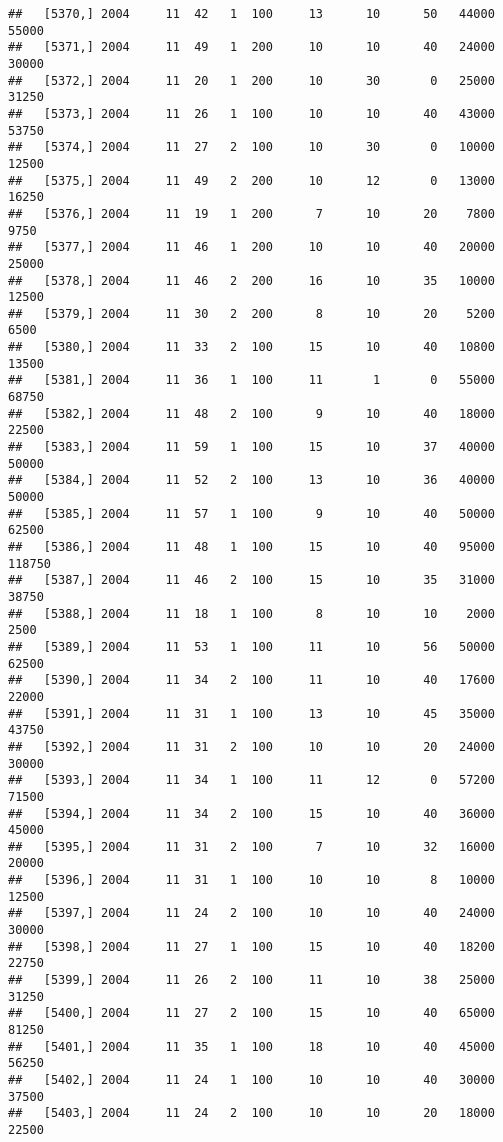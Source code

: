 \documentclass{article}\usepackage[]{graphicx}\usepackage[]{color}
\makeatletter
\newenvironment{kframe}{%
 \def\at@end@of@kframe{}%
 \ifinner\ifhmode%
  \def\at@end@of@kframe{\end{minipage}}%
  \begin{minipage}{\columnwidth}%
 \fi\fi%
 \def\FrameCommand##1{\hskip\@totalleftmargin \hskip-\fboxsep
 \colorbox{shadecolor}{##1}\hskip-\fboxsep
     \hskip-\linewidth \hskip-\@totalleftmargin \hskip\columnwidth}%
 \MakeFramed {\advance\hsize-\width
   \@totalleftmargin\z@ \linewidth\hsize
   \@setminipage}}%
 {\par\unskip\endMakeFramed%
 \at@end@of@kframe}
\newenvironment{knitrout}{}{} %
\makeatother
\begin{document}
\begin{knitrout}
\begin{kframe}
\begin{verbatim}
##   [5370,] 2004     11  42   1  100     13      10      50   44000   55000
##   [5371,] 2004     11  49   1  200     10      10      40   24000   30000
##   [5372,] 2004     11  20   1  200     10      30       0   25000   31250
##   [5373,] 2004     11  26   1  100     10      10      40   43000   53750
##   [5374,] 2004     11  27   2  100     10      30       0   10000   12500
##   [5375,] 2004     11  49   2  200     10      12       0   13000   16250
##   [5376,] 2004     11  19   1  200      7      10      20    7800    9750
##   [5377,] 2004     11  46   1  200     10      10      40   20000   25000
##   [5378,] 2004     11  46   2  200     16      10      35   10000   12500
##   [5379,] 2004     11  30   2  200      8      10      20    5200    6500
##   [5380,] 2004     11  33   2  100     15      10      40   10800   13500
##   [5381,] 2004     11  36   1  100     11       1       0   55000   68750
##   [5382,] 2004     11  48   2  100      9      10      40   18000   22500
##   [5383,] 2004     11  59   1  100     15      10      37   40000   50000
##   [5384,] 2004     11  52   2  100     13      10      36   40000   50000
##   [5385,] 2004     11  57   1  100      9      10      40   50000   62500
##   [5386,] 2004     11  48   1  100     15      10      40   95000  118750
##   [5387,] 2004     11  46   2  100     15      10      35   31000   38750
##   [5388,] 2004     11  18   1  100      8      10      10    2000    2500
##   [5389,] 2004     11  53   1  100     11      10      56   50000   62500
##   [5390,] 2004     11  34   2  100     11      10      40   17600   22000
##   [5391,] 2004     11  31   1  100     13      10      45   35000   43750
##   [5392,] 2004     11  31   2  100     10      10      20   24000   30000
##   [5393,] 2004     11  34   1  100     11      12       0   57200   71500
##   [5394,] 2004     11  34   2  100     15      10      40   36000   45000
##   [5395,] 2004     11  31   2  100      7      10      32   16000   20000
##   [5396,] 2004     11  31   1  100     10      10       8   10000   12500
##   [5397,] 2004     11  24   2  100     10      10      40   24000   30000
##   [5398,] 2004     11  27   1  100     15      10      40   18200   22750
##   [5399,] 2004     11  26   2  100     11      10      38   25000   31250
##   [5400,] 2004     11  27   2  100     15      10      40   65000   81250
##   [5401,] 2004     11  35   1  100     18      10      40   45000   56250
##   [5402,] 2004     11  24   1  100     10      10      40   30000   37500
##   [5403,] 2004     11  24   2  100     10      10      20   18000   22500

\end{verbatim}
\end{kframe}
\end{knitrout}
\end{document}
